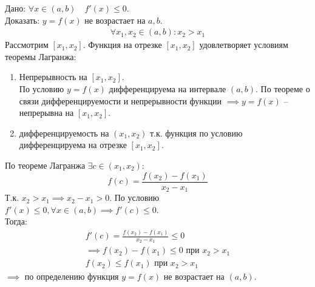 \begin{sufficiency}
    Дано: $\forall x \in (a, b) \quad f'(x) \le 0$. \\
    Доказать: $y = f(x)$ не возрастает на  $a, b$.
    \begin{gather*}
        \forall x_1, x_2 \in (a,b) : x_2 > x_1
    \end{gather*}
    Рассмотрим $[x_1, x_2]$. Функция на отрезке $[x_1, x_2]$ удовлетворяет условиям теоремы Лагранжа:
    \begin{enumerate}
        \item Непрерывность на $[x_1, x_2]$. \\
        По условию $y = f(x)$ дифференцируема на интервале  $(a, b)$. По теореме о связи дифференцируемости и непрерывности функции  $\implies y=f(x)$ -- непрерывна на $[x_1, x_2]$.
        \item дифференцируемость на $(x_1, x_2)$ т.к. функция по условию дифференцируема на отрезке $[x_1, x_2]$.
    \end{enumerate}
    По теореме Лагранжа $\exists c \in (x_1, x_2)$: \[
        f(c) = \frac{f(x_2) - f(x_1)}{x_2 - x_1}
    \] 
    Т.к. $x_2 > x_1 \implies x_2 - x_1 > 0$. По условию $f'(x) \le  0, \forall x \in  (a, b) \implies f'(c) \le 0$. \\
    Тогда:
    \begin{gather*}
        f'(c) = \frac{f(x_2) - f(x_1)}{x_2 - x_1} \le 0 \\
        \implies f(x_2) - f(x_1) \le  0 \text{ при } x_2 > x_1 \\
        f(x_2) \le  f(x_1) \text{ при } x_2 > x_1
    \end{gather*}
    $\implies$ по определению функция $y = f(x)$ не возрастает на $(a, b)$.
\end{sufficiency}
\pagebreak



